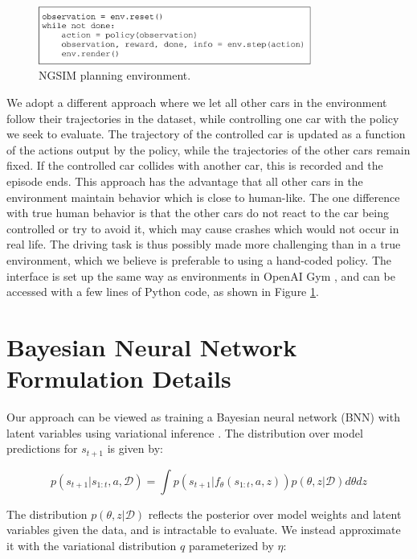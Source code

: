 \documentclass{article} %
\begin{document}
\begin{figure}
  \centering
  \includegraphics[width=0.8\textwidth]{figures/driving/traffic_gym_code-crop.pdf}
  \caption{NGSIM planning environment.}
\label{interface}
\end{figure}


We adopt a different approach where we let all other cars in the environment follow their trajectories in the dataset, while controlling one car with the policy we seek to evaluate.
The trajectory of the controlled car is updated as a function of the actions output by the policy, while the trajectories of the other cars remain fixed.
If the controlled car collides with another car, this is recorded and the episode ends.
This approach has the advantage that all other cars in the environment maintain behavior which is close to human-like.
The one difference with true human behavior is that the other cars do not react to the car being controlled or try to avoid it, which may cause crashes which would not occur in real life.
The driving task is thus possibly made more challenging than in a true environment, which we believe is preferable to using a hand-coded policy.
The interface is set up the same way as environments in OpenAI Gym \citep{OpenAIBaselines}, and can be accessed with a few lines of Python code, as shown in Figure \ref{interface}.



\section{Bayesian Neural Network Formulation Details}
\label{bnn-details}

Our \modelnamedrop approach can be viewed as training a Bayesian neural network (BNN) \citep{Neal1995} with latent variables using variational inference \citep{Jordan1999, VAE}. 
The distribution over model predictions for $s_{t+1}$ is given by:

\begin{equation*}
  p(s_{t+1} | s_{1:t}, a, \mathcal{D}) = \int p(s_{t+1} | f_\theta(s_{1:t}, a, z)) p(\theta, z | \mathcal{D}) d\theta dz
\end{equation*}

The distribution $p(\theta, z | \mathcal{D})$ reflects the posterior over model weights and latent variables given the data, and is intractable to evaluate.
We instead approximate it with the variational distribution $q$ parameterized by $\eta$:
\end{document}
